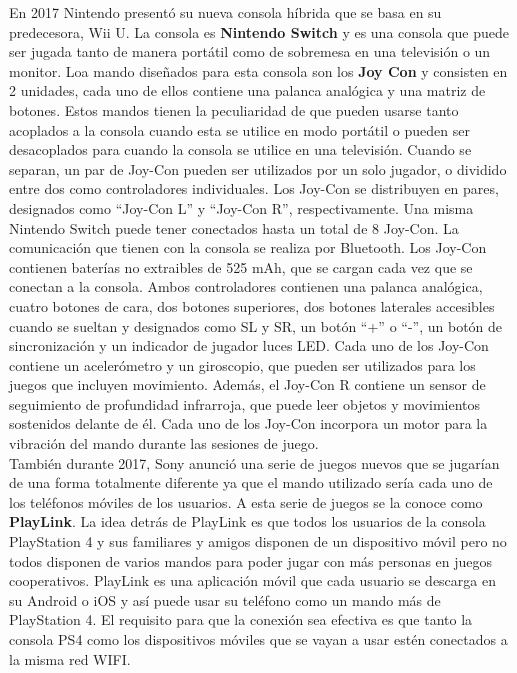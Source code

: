 En 2017 Nintendo present\'o su nueva consola h\'ibrida que se basa en su predecesora, Wii U. La consola es \textbf{Nintendo Switch} y es una consola que puede ser jugada tanto de manera port\'atil como de sobremesa en una televisi\'on o un monitor. Loa mando dise\~nados para esta consola son los \textbf{Joy Con} y consisten en 2 unidades, cada uno de ellos contiene una palanca anal\'ogica y una matriz de botones. Estos mandos tienen la peculiaridad de que pueden usarse tanto acoplados a la consola cuando esta se utilice en modo port\'atil o pueden ser desacoplados para cuando la consola se utilice en una televisi\'on. Cuando se separan, un par de Joy-Con pueden ser utilizados por un solo jugador, o dividido entre dos como controladores individuales. Los Joy-Con se distribuyen en pares, designados como ``Joy-Con L'' y ``Joy-Con R'', respectivamente. Una misma Nintendo Switch puede tener conectados hasta un total de 8 Joy-Con. La comunicaci\'on que tienen con la consola se realiza por Bluetooth. Los Joy-Con contienen bater\'ias no extraibles de 525 mAh, que se cargan cada vez que se conectan a la consola. Ambos controladores contienen una palanca anal\'ogica, cuatro botones de cara, dos botones superiores, dos botones laterales accesibles cuando se sueltan y designados como SL y SR, un bot\'on ``+'' o ``-'', un bot\'on de sincronizaci\'on y un indicador de jugador luces LED. Cada uno de los Joy-Con contiene un aceler\'ometro y un giroscopio, que pueden ser utilizados para los juegos que incluyen movimiento. Adem\'as, el Joy-Con R contiene un sensor de seguimiento de profundidad infrarroja, que puede leer objetos y movimientos sostenidos delante de \'el. Cada uno de los Joy-Con incorpora un motor para la vibraci\'on del mando durante las sesiones de juego.\\

Tambi\'en durante 2017, Sony anunci\'o una serie de juegos nuevos que se jugar\'ian de una forma totalmente diferente ya que el mando utilizado ser\'ia cada uno de los tel\'efonos m\'oviles de los usuarios. A esta serie de juegos se la conoce como \textbf{PlayLink}. La idea detr\'as de PlayLink es que todos los usuarios de la consola PlayStation 4 y sus familiares y amigos disponen de un dispositivo m\'ovil pero no todos disponen de varios mandos para poder jugar con m\'as personas en juegos cooperativos. PlayLink es una aplicaci\'on m\'ovil que cada usuario se descarga en su Android o iOS y as\'i puede usar su tel\'efono como un mando m\'as de PlayStation 4. El requisito para que la conexi\'on sea efectiva es que tanto la consola PS4 como los dispositivos m\'oviles que se vayan a usar est\'en conectados a la misma red WIFI.\\

